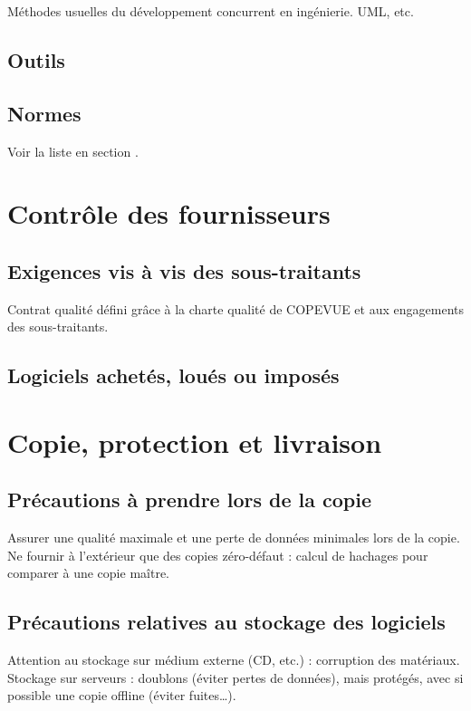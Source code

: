 Méthodes usuelles du développement concurrent en ingénierie. UML, etc.

\section{Outils}

\section{Normes}

Voir la liste en section .

\chapter{Contrôle des fournisseurs}

\section{Exigences vis à vis des sous-traitants}

Contrat qualité défini grâce à la charte qualité de COPEVUE et aux engagements des sous-traitants.

\section{Logiciels achetés, loués ou imposés}

\chapter{Copie, protection et livraison}

\section{Précautions à prendre lors de la copie}

Assurer une qualité maximale et une perte de données minimales lors de la copie. Ne fournir à l'extérieur que des copies zéro-défaut : calcul de hachages pour comparer à une copie maître.

\section{Précautions relatives au stockage des logiciels}

Attention au stockage sur médium externe (CD, etc.) : corruption des matériaux. Stockage sur serveurs : doublons (éviter pertes de données), mais protégés, avec si possible une copie offline (éviter fuites\ldots).

